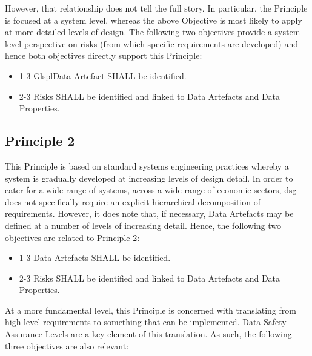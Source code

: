 However, that relationship does not tell the full story. In particular, the Principle is focused at a system level, whereas the above Objective is most likely to apply at more detailed levels of design. The following two objectives provide a system-level perspective on risks (from which specific requirements are developed) and hence both objectives directly support this Principle:

\begin{itemize}
	\item \textcolor{dsiwgAccentColour}{1-3} Glspl{Data Artefact} SHALL be identified.
	\item \textcolor{dsiwgAccentColour}{2-3} Risks SHALL be identified and linked to \glspl{Data Artefact} and Data Properties.
\end{itemize}


\subsection{Principle 2}

This Principle is based on standard systems engineering practices whereby a system is gradually developed at increasing levels of design detail. In order to cater for a wide range of systems, across a wide range of economic sectors, \gls{dsg} does not specifically require an explicit hierarchical decomposition of requirements. However, it does note that, if necessary, \glspl{Data Artefact} may be defined at a number of levels of increasing detail. Hence, the following two objectives are related to Principle 2:

\begin{itemize}
	\item \textcolor{dsiwgAccentColour}{1-3} \Glspl{Data Artefact} SHALL be identified.
	\item \textcolor{dsiwgAccentColour}{2-3} Risks SHALL be identified and linked to \glspl{Data Artefact} and Data Properties.
\end{itemize}

At a more fundamental level, this Principle is concerned with translating from high-level requirements to something that can be implemented. Data Safety Assurance Levels are a key element of this translation. As such, the following three objectives are also relevant:

